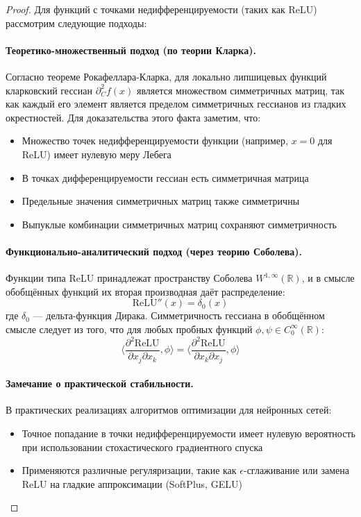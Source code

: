 \documentclass[a4paper,12pt]{article}
\begin{document}
\begin{proof}
    Для функций с точками недифференцируемости (таких как ReLU) рассмотрим следующие подходы:
    
    \paragraph{Теоретико-множественный подход (по теории Кларка).} 
    Согласно теореме Рокафеллара-Кларка, для локально липшицевых функций кларковский гессиан $\partial_C^2 f(x)$ является множеством симметричных матриц, так как каждый его элемент является пределом симметричных гессианов из гладких окрестностей. Для доказательства этого факта заметим, что:
    \begin{itemize}
    \item Множество точек недифференцируемости функции (например, $x = 0$ для ReLU) имеет нулевую меру Лебега
    \item В точках дифференцируемости гессиан есть симметричная матрица
    \item Предельные значения симметричных матриц также симметричны
    \item Выпуклые комбинации симметричных матриц сохраняют симметричность
    \end{itemize}
    
    \paragraph{Функционально-аналитический подход (через теорию Соболева).}
    Функции типа ReLU принадлежат пространству Соболева $W^{1,\infty}(\mathbb{R})$, и в смысле обобщённых функций их вторая производная даёт распределение:
    \begin{equation}
    \text{ReLU}''(x) = \delta_0(x)
    \end{equation}
    где $\delta_0$ — дельта-функция Дирака. Симметричность гессиана в обобщённом смысле следует из того, что для любых пробных функций $\phi, \psi \in C_0^\infty(\mathbb{R})$:
    \begin{equation}
    \langle \frac{\partial^2 \text{ReLU}}{\partial x_j \partial x_k}, \phi \rangle = 
    \langle \frac{\partial^2 \text{ReLU}}{\partial x_k \partial x_j}, \phi \rangle
    \end{equation}
    
    \paragraph{Замечание о практической стабильности.}
    В практических реализациях алгоритмов оптимизации для нейронных сетей:
    \begin{itemize}
    \item Точное попадание в точки недифференцируемости имеет нулевую вероятность при использовании стохастического градиентного спуска
    \item Применяются различные регуляризации, такие как $\epsilon$-сглаживание или замена ReLU на гладкие аппроксимации (SoftPlus, GELU)
    \end{itemize}
    

\end{proof}
\end{document}
